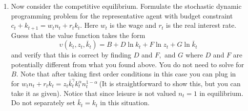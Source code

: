 \documentclass[11pt]{article}
\begin{document}
\begin{enumerate}
\begin{enumerate}
\item Now consider the competitive equilibrium. Formulate the stochastic
dynamic programming problem for the representative agent with budget
constraint $c_{t}+k_{t+1}=w_{t}n_{t}+r_{t}k_{t}.$ Here $w_{t}$ is the wage
and $r_{t}$ is the real interest rate. Guess that the value function takes
the form%
\begin{equation*}
\upsilon \left( k_{t},z_{t},\bar{k}_{t}\right) =B+D\ln k_{t}+F\ln z_{t}+G\ln 
\bar{k}_{t}
\end{equation*}%
and verify that this is correct by finding $D$ and $F,$ and $G$ where $D$
and $F$ are potentially different from what you found above. You do not need
to solve for $B$. Note that after taking first order conditions in this case
you can plug in for $w_{t}n_{t}+r_{t}k_{t}=z_{t}\bar{k}_{t}^{\gamma
}k_{t}^{\alpha }n_{t}^{1-\alpha }\ $(It is straightforward to show this, but
you can take it as given). Notice that since leisure is not valued $n_{t}=1$
in equilibrium$.$ Do not separately set $\bar{k}_{t}=k_{t}$ in this
situation.
\end{enumerate}
\end{enumerate}

\pagebreak \pagebreak
\end{document}
